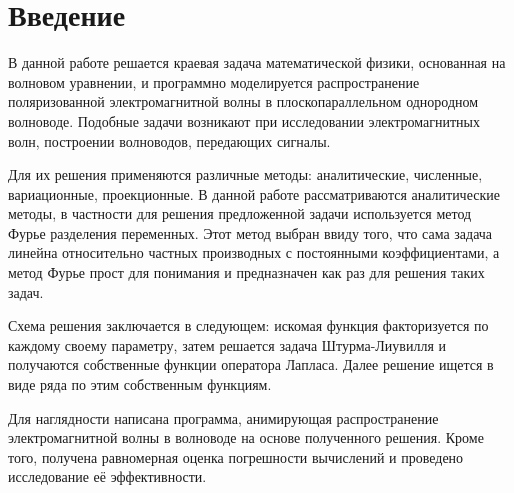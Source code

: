 \chapter*{Введение}

В данной работе решается краевая задача математической физики, основанная на волновом уравнении, и программно моделируется распространение поляризованной электромагнитной волны в плоскопараллельном однородном волноводе. Подобные задачи возникают при исследовании электромагнитных волн, построении волноводов, передающих сигналы.

Для их решения применяются различные методы: аналитические, численные, вариационные, проекционные.  В данной работе рассматриваются аналитические методы, в частности для решения предложенной задачи используется метод Фурье разделения переменных. Этот метод выбран ввиду того, что сама задача линейна относительно частных производных с постоянными коэффициентами, а метод Фурье прост для понимания и предназначен как раз для решения таких задач.

Схема решения заключается в следующем: искомая функция факторизуется по каждому своему параметру, затем решается задача Штурма-Лиувилля и получаются собственные функции оператора Лапласа. Далее решение ищется в виде ряда по этим собственным функциям.

Для наглядности написана программа, анимирующая распространение электромагнитной волны в волноводе на основе полученного решения. Кроме того, получена равномерная оценка погрешности вычислений и проведено исследование её эффективности.